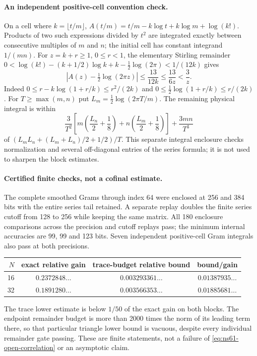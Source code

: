 \paragraph{An independent positive-cell convention check.}
On a cell where $k=\lfloor t/m\rfloor$,
$A(t/m)=t/m-k\log t+k\log m+\log(k!)$.
Products of two such expressions divided by $t^2$ are integrated
exactly between consecutive multiples of $m$ and $n$; the initial
cell has constant integrand $1/(mn)$.
For $z=k+r\geq1$, $0\leq r<1$, the elementary Stirling remainder
\cite[\S5.11]{DLMFGammaBounds}
$0<\log(k!)-(k+1/2)\log k+k-\tfrac12\log(2\pi)<1/(12k)$
gives
\[
 \left|A(z)-\tfrac12\log(2\pi z)\right|
 \leq\frac{13}{12k}\leq\frac{13}{6z}<\frac3z.
\]
Indeed $0\leq r-k\log(1+r/k)\leq r^2/(2k)$ and
$0\leq\tfrac12\log(1+r/k)\leq r/(2k)$.
For $T\geq\max(m,n)$ put $L_m=\tfrac12\log(2\pi T/m)$.
The remaining physical integral is within
\[
 \frac3{T^2}\left[m\left(\frac{L_n}2+\frac18\right)
                 +n\left(\frac{L_m}2+\frac18\right)\right]
            +\frac{3mn}{T^3}
\]
of $(L_mL_n+(L_m+L_n)/2+1/2)/T$.
This separate integral enclosure checks normalization and several
off-diagonal entries of the series formula; it is not used to sharpen
the block estimates.

\paragraph{Certified finite checks, not a cofinal estimate.}
The complete smoothed Grams through index 64 were enclosed at 256 and
384 bits with the entire series tail retained. A separate replay doubles
the finite series cutoff from 128 to 256 while keeping the same matrix.
All 180 enclosure comparisons across the precision and cutoff replays pass; the minimum internal accuracies are
99, 99 and 123 bits. Seven independent positive-cell Gram integrals
also pass at both precisions.
\begin{center}
\begin{tabular}{rccc}
\toprule
$N$ & exact relative gain & trace-budget relative bound & bound/gain\\
\midrule
16 & $0.2372848\ldots$ & $0.003293361\ldots$ & $0.01387935\ldots$\\
32 & $0.1891280\ldots$ & $0.003566353\ldots$ & $0.01885681\ldots$\\
\bottomrule
\end{tabular}
\end{center}
The trace lower estimate is below $1/50$ of the exact gain on both
blocks. The endpoint remainder budget is more than 2000 times the norm
of its leading term there, so that particular triangle lower bound is
vacuous, despite every individual remainder gate passing.
These are finite statements, not a failure of
\eqref{eq:ns61-open-correlation} or an asymptotic claim.

